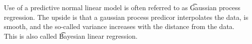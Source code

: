 Use of a predictive normal linear model is often referred to as \t{Gaussian process regression}.
The upside is that a gaussian process predicor interpolates the data, is smooth, and the so-called variance increases with the distance from the data.
This is also called \t{Bayesian linear regression}.

